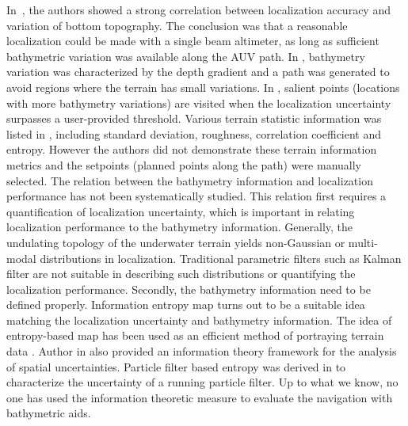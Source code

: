 In~\cite{Kalyan2013}, the authors showed a strong correlation between localization accuracy and variation of bottom topography. The conclusion was that a reasonable localization could be made with a single beam altimeter, as long as sufficient bathymetric variation was available along the AUV path. In \cite{Rodrigo2015}, bathymetry variation was characterized by the depth gradient and a path was generated to avoid regions where the terrain has small variations. In \cite{Galceran2013}, salient points (locations with more bathymetry variations) are visited when the localization uncertainty surpasses a user-provided threshold. Various terrain statistic information was listed in \cite{Peng2016}, including standard deviation, roughness, correlation coefficient and entropy. However the authors did not demonstrate these terrain information metrics and the setpoints (planned points along the path) were manually selected. The relation between the bathymetry information and localization performance has not been systematically studied. This relation first requires a quantification of localization uncertainty, which is important in relating localization performance to the bathymetry information. Generally, the undulating topology of the underwater terrain yields non-Gaussian or multi-modal distributions in localization. Traditional parametric filters such as Kalman filter are not suitable in describing such distributions or quantifying the localization performance. Secondly, the bathymetry information need to be defined properly. Information entropy map turns out to be a suitable idea matching the localization uncertainty and bathymetry information. The idea of entropy-based map has been used as an efficient method of portraying terrain data \cite{Fairbair2011}. Author in \cite{Wellmann2013} also provided an information theory framework for the analysis of spatial uncertainties. Particle filter based entropy was derived in \cite{Bpers2010} to characterize the uncertainty of a running particle filter. Up to what we know, no one has used the information theoretic measure to evaluate the navigation with bathymetric aids.